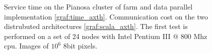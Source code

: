 \begin{figure}[p]
\centering
{}
\caption{ Service time on the Pianosa cluster of farm and data parallel implementation \ref{graf:time_axth}. Communication cost on the two distrubuted architectures \ref{graf:scala_axth}. The first test is performed on a set of 24 nodes with Intel Pentium III @ 800 Mhz cpu. Images of $10^6$ 8bit pixels.}
\label{chart:pianosa_comm}
\end{figure}



